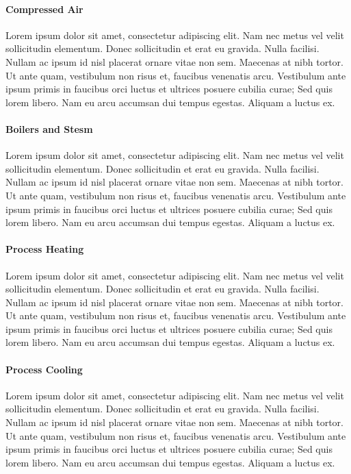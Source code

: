\paragraph{Compressed Air} Lorem ipsum dolor sit amet, consectetur adipiscing elit. Nam nec metus vel velit sollicitudin elementum. Donec sollicitudin et erat eu gravida. Nulla facilisi. Nullam ac ipsum id nisl placerat ornare vitae non sem. Maecenas at nibh tortor. Ut ante quam, vestibulum non risus et, faucibus venenatis arcu. Vestibulum ante ipsum primis in faucibus orci luctus et ultrices posuere cubilia curae; Sed quis lorem libero. Nam eu arcu accumsan dui tempus egestas. Aliquam a luctus ex.

\paragraph{Boilers and Stesm} Lorem ipsum dolor sit amet, consectetur adipiscing elit. Nam nec metus vel velit sollicitudin elementum. Donec sollicitudin et erat eu gravida. Nulla facilisi. Nullam ac ipsum id nisl placerat ornare vitae non sem. Maecenas at nibh tortor. Ut ante quam, vestibulum non risus et, faucibus venenatis arcu. Vestibulum ante ipsum primis in faucibus orci luctus et ultrices posuere cubilia curae; Sed quis lorem libero. Nam eu arcu accumsan dui tempus egestas. Aliquam a luctus ex.

\paragraph{Process Heating} Lorem ipsum dolor sit amet, consectetur adipiscing elit. Nam nec metus vel velit sollicitudin elementum. Donec sollicitudin et erat eu gravida. Nulla facilisi. Nullam ac ipsum id nisl placerat ornare vitae non sem. Maecenas at nibh tortor. Ut ante quam, vestibulum non risus et, faucibus venenatis arcu. Vestibulum ante ipsum primis in faucibus orci luctus et ultrices posuere cubilia curae; Sed quis lorem libero. Nam eu arcu accumsan dui tempus egestas. Aliquam a luctus ex.

\paragraph{Process Cooling} Lorem ipsum dolor sit amet, consectetur adipiscing elit. Nam nec metus vel velit sollicitudin elementum. Donec sollicitudin et erat eu gravida. Nulla facilisi. Nullam ac ipsum id nisl placerat ornare vitae non sem. Maecenas at nibh tortor. Ut ante quam, vestibulum non risus et, faucibus venenatis arcu. Vestibulum ante ipsum primis in faucibus orci luctus et ultrices posuere cubilia curae; Sed quis lorem libero. Nam eu arcu accumsan dui tempus egestas. Aliquam a luctus ex.

